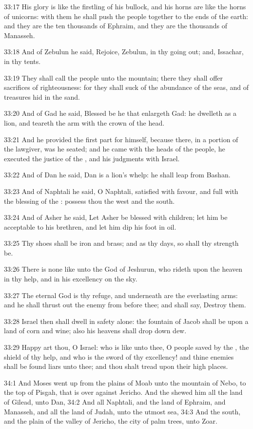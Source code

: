 33:17 His glory is like the firstling of his bullock, and his horns are like the horns of unicorns: with them he shall push the people together to the ends of the earth: and they are the ten thousands of Ephraim, and they are the thousands of Manasseh.

33:18 And of Zebulun he said, Rejoice, Zebulun, in thy going out; and, Issachar, in thy tents.

33:19 They shall call the people unto the mountain; there they shall offer sacrifices of righteousness: for they shall suck of the abundance of the seas, and of treasures hid in the sand.

33:20 And of Gad he said, Blessed be he that enlargeth Gad: he dwelleth as a lion, and teareth the arm with the crown of the head.

33:21 And he provided the first part for himself, because there, in a portion of the lawgiver, was he seated; and he came with the heads of the people, he executed the justice of the \LORD, and his judgments with Israel.

33:22 And of Dan he said, Dan is a lion's whelp: he shall leap from Bashan.

33:23 And of Naphtali he said, O Naphtali, satisfied with favour, and full with the blessing of the \LORD: possess thou the west and the south.

33:24 And of Asher he said, Let Asher be blessed with children; let him be acceptable to his brethren, and let him dip his foot in oil.

33:25 Thy shoes shall be iron and brass; and as thy days, so shall thy strength be.

33:26 There is none like unto the God of Jeshurun, who rideth upon the heaven in thy help, and in his excellency on the sky.

33:27 The eternal God is thy refuge, and underneath are the everlasting arms: and he shall thrust out the enemy from before thee; and shall say, Destroy them.

33:28 Israel then shall dwell in safety alone: the fountain of Jacob shall be upon a land of corn and wine; also his heavens shall drop down dew.

33:29 Happy art thou, O Israel: who is like unto thee, O people saved by the \LORD, the shield of thy help, and who is the sword of thy excellency! and thine enemies shall be found liars unto thee; and thou shalt tread upon their high places.

34:1 And Moses went up from the plains of Moab unto the mountain of Nebo, to the top of Pisgah, that is over against Jericho. And the \LORD shewed him all the land of Gilead, unto Dan, 34:2 And all Naphtali, and the land of Ephraim, and Manasseh, and all the land of Judah, unto the utmost sea, 34:3 And the south, and the plain of the valley of Jericho, the city of palm trees, unto Zoar.

